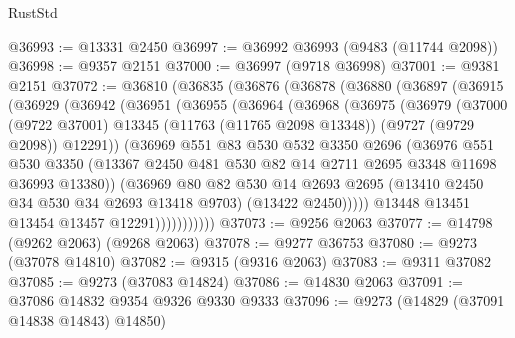 \begin{lexlean}{RustStd}
\begin{coremodule}
{\begin{coremodule}
{{{{{{{{{{{{{{{{{{{{{{{{{{{{{{{{{{{{{{{{{{{{{{{{{{{{{{{@36993 := @13331 @2450
@36997 := @36992 @36993 (@9483 (@11744 @2098))
@36998 := @9357 @2151
@37000 := @36997 (@9718 @36998)
@37001 := @9381 @2151
@37072 := @36810
    (@36835
      (@36876
        (@36878
          (@36880
            (@36897
              (@36915
                (@36929
                  (@36942
                    (@36951
                      (@36955
                        (@36964
                          (@36968
                            (@36975
                              (@36979
                                (@37000
                                  (@9722 @37001)
                                  @13345
                                  (@11763 (@11765 @2098 @13348))
                                  (@9727 (@9729 @2098))
                                  @12291))
                              (@36969
                                @551
                                @83
                                @530
                                @532
                                @3350
                                @2696
                                (@36976
                                  @551
                                  @530
                                  @3350
                                  (@13367
                                    @2450
                                    @481
                                    @530
                                    @82
                                    @14
                                    @2711
                                    @2695
                                    @3348
                                    @11698
                                    @36993
                                    @13380))
                                (@36969
                                  @80
                                  @82
                                  @530
                                  @14
                                  @2693
                                  @2695
                                  (@13410 @2450 @34 @530 @34 @2693 @13418 @9703)
                                  (@13422 @2450)))))
                          @13448
                          @13451
                          @13454
                          @13457
                          @12291)))))))))))
@37073 := @9256 @2063
@37077 := @14798 (@9262 @2063) (@9268 @2063)
@37078 := @9277 @36753
@37080 := @9273 (@37078 @14810)
@37082 := @9315 (@9316 @2063)
@37083 := @9311 @37082
@37085 := @9273 (@37083 @14824)
@37086 := @14830 @2063
@37091 := @37086 @14832 @9354 @9326 @9330 @9333
@37096 := @9273 (@14829 (@37091 @14838 @14843) @14850)
}}}}}}}}}}}}}}}}}}}}}}}}}}}}}}}}}}}}}}}}}}}}}}}}}}}}}}}
\end{coremodule}}
\end{coremodule}
\end{lexlean}
